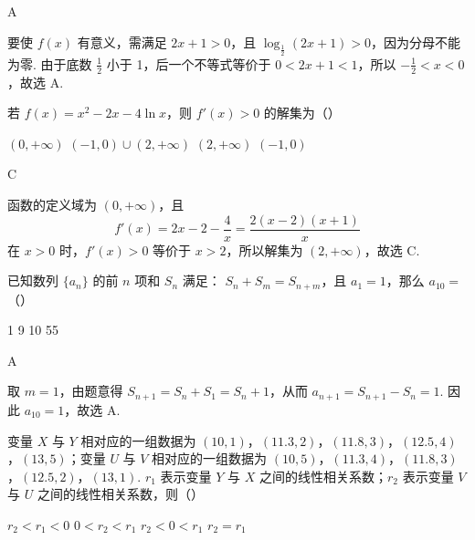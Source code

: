 \begin{answer}
A
\end{answer}

\begin{solution}
要使 \(f(x)\) 有意义，需满足 \(2x+1>0\)，且
\(\log_{\frac{1}{2}}(2x+1)>0\)，因为分母不能为零. 由于底数
\(\frac{1}{2}\) 小于 1，后一个不等式等价于 \(0<2x+1<1\)，所以
\(-\frac{1}{2}<x<0\)，故选 A.
\end{solution}

\begin{problem}
若 \( f(x) = x^2 - 2x - 4\ln x \)，则 \( f'(x) > 0 \) 的解集为（\quad）

\choices
    {\((0, +\infty)\)}
    {\((-1,0)\cup (2, + \infty)\)}
    {\((2, +\infty)\)}
    {\((-1,0)\)}
\end{problem}

\begin{answer}
C
\end{answer}

\begin{solution}
函数的定义域为 \((0,+\infty)\)，且
\[
f'(x)=2x-2-\frac{4}{x}=\frac{2(x-2)(x+1)}{x}
\]
在 \(x>0\) 时，\(f'(x)>0\) 等价于 \(x>2\)，所以解集为
\((2,+\infty)\)，故选 C.
\end{solution}

\begin{problem}
已知数列 \(\{a_{n}\}\) 的前 \(n\) 项和 \(S_{n}\) 满足： \(S_{n} + S_{m} = S_{n + m}\)，且 \(a_{1} = 1\)，那么 \(a_{10} =\)（\quad）

\choices
    {1}
    {9}
    {10}
    {55}
\end{problem}

\begin{answer}
A
\end{answer}

\begin{solution}
取 \(m=1\)，由题意得 \(S_{n+1}=S_n+S_1=S_n+1\)，从而
\(a_{n+1}=S_{n+1}-S_n=1\). 因此 \(a_{10}=1\)，故选 A.
\end{solution}

\begin{problem}
变量 \(X\) 与 \(Y\) 相对应的一组数据为 \((10, 1)\)，\((11.3, 2)\)，\((11.8, 3)\)，\((12.5, 4)\)，\((13, 5)\)；变量 \(U\) 与 \(V\) 相对应的一组数据为 \((10, 5)\)，\((11.3, 4)\)，\((11.8, 3)\)，\((12.5, 2)\)，\((13, 1)\). \(r_{1}\) 表示变量 \(Y\) 与 \(X\) 之间的线性相关系数；\(r_{2}\) 表示变量 \(V\) 与 \(U\) 之间的线性相关系数，则（\quad）

\choices
    {\(r_2 < r_1 < 0\)}
    {\(0 < r_2 < r_1\)}
    {\(r_2 < 0 < r_1\)}
    {\(r_2 = r_1\)}
\end{problem}

